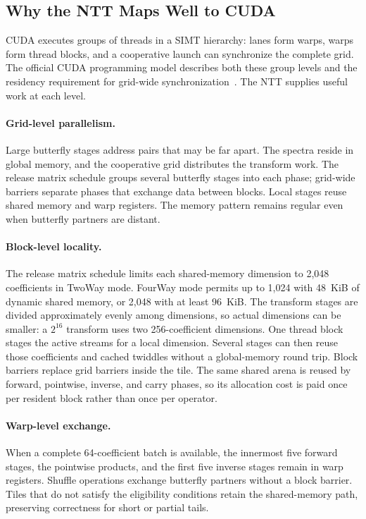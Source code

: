 \subsection{Why the NTT Maps Well to CUDA}
\label{subsec:ntt-gpu-mapping}

CUDA executes groups of threads in a SIMT hierarchy: lanes form warps, warps
form thread blocks, and a cooperative launch can synchronize the complete grid.
The official CUDA programming model describes both these group levels and the
residency requirement for grid-wide synchronization~\cite{NvidiaCudaProgrammingGuide}.
The NTT supplies useful work at each level.

\paragraph{Grid-level parallelism.}
Large butterfly stages address pairs that may be far apart.  The spectra reside
in global memory, and the cooperative grid distributes the transform work.
The release matrix schedule groups several butterfly stages into each phase;
grid-wide barriers separate phases that exchange data between blocks.  Local
stages reuse shared memory and warp registers.  The memory pattern remains
regular even when butterfly partners are distant.

\paragraph{Block-level locality.}
The release matrix schedule limits each shared-memory dimension to 2,048
coefficients in TwoWay mode.  FourWay mode permits up to 1,024 with 48~KiB of
dynamic shared memory, or 2,048 with at least 96~KiB.  The transform stages are
divided approximately evenly among dimensions, so actual dimensions can be
smaller: a $2^{16}$ transform uses two 256-coefficient dimensions.
One thread block stages the active streams for a local dimension.  Several
stages can then reuse those coefficients and cached twiddles without a
global-memory round trip.  Block barriers replace grid barriers inside the tile.  The same
shared arena is reused by forward, pointwise, inverse, and carry phases, so its
allocation cost is paid once per resident block rather than once per operator.

\paragraph{Warp-level exchange.}
When a complete 64-coefficient batch is available, the innermost five forward
stages, the pointwise products, and the first five inverse stages remain in
warp registers.  Shuffle operations exchange butterfly partners without a
block barrier.  Tiles that do not satisfy the eligibility conditions retain
the shared-memory path, preserving correctness for short or partial tails.

